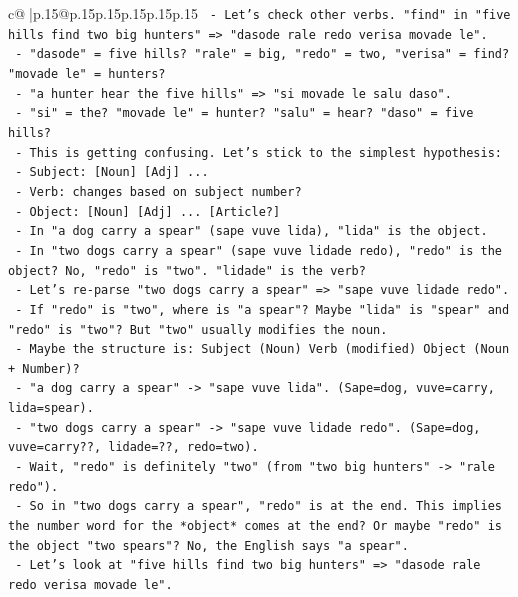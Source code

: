 \documentclass{article}
\begin{document}
{\begin{supertabular}{c@{$\;$}|p{.15\linewidth}@{}p{.15\linewidth}p{.15\linewidth}p{.15\linewidth}p{.15\linewidth}p{.15\linewidth}}
{{{\texttt{      {-} Let's check other verbs. "find" in "five hills find two big hunters" => "dasode rale redo verisa movade le".} \\
\texttt{        {-} "dasode" = five hills? "rale" = big, "redo" = two, "verisa" = find? "movade le" = hunters?} \\
\texttt{        {-} "a hunter hear the five hills" => "si movade le salu daso".} \\
\texttt{          {-} "si" = the? "movade le" = hunter? "salu" = hear? "daso" = five hills?} \\
\texttt{          {-} This is getting confusing. Let's stick to the simplest hypothesis:} \\
\texttt{          {-} Subject: {[}Noun{]} {[}Adj{]} ...} \\
\texttt{          {-} Verb: changes based on subject number?} \\
\texttt{          {-} Object: {[}Noun{]} {[}Adj{]} ... {[}Article?{]}} \\
\texttt{          {-} In "a dog carry a spear" (sape vuve lida), "lida" is the object.} \\
\texttt{          {-} In "two dogs carry a spear" (sape vuve lidade redo), "redo" is the object? No, "redo" is "two". "lidade" is the verb?} \\
\texttt{          {-} Let's re{-}parse "two dogs carry a spear" => "sape vuve lidade redo".} \\
\texttt{            {-} If "redo" is "two", where is "a spear"? Maybe "lida" is "spear" and "redo" is "two"? But "two" usually modifies the noun.} \\
\texttt{            {-} Maybe the structure is: Subject (Noun) Verb (modified) Object (Noun + Number)?} \\
\texttt{            {-} "a dog carry a spear" {-}> "sape vuve lida". (Sape=dog, vuve=carry, lida=spear).} \\
\texttt{            {-} "two dogs carry a spear" {-}> "sape vuve lidade redo". (Sape=dog, vuve=carry??, lidade=??, redo=two).} \\
\texttt{            {-} Wait, "redo" is definitely "two" (from "two big hunters" {-}> "rale redo").} \\
\texttt{            {-} So in "two dogs carry a spear", "redo" is at the end. This implies the number word for the *object* comes at the end? Or maybe "redo" is the object "two spears"? No, the English says "a spear".} \\
\texttt{            {-} Let's look at "five hills find two big hunters" => "dasode rale redo verisa movade le".} \\
}}}
\end{supertabular}}
\end{document}
